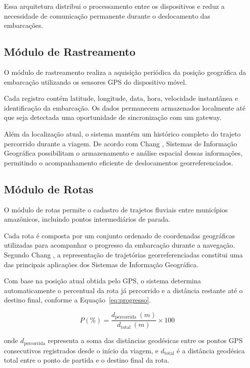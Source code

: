 \documentclass[12pt]{article}
\begin{document}
Essa arquitetura distribui o processamento entre os dispositivos e reduz a necessidade de comunicação permanente durante o deslocamento das embarcações.

\subsection{Módulo de Rastreamento}
O módulo de rastreamento realiza a aquisição periódica da posição geográfica da embarcação utilizando os sensores GPS do dispositivo móvel.

Cada registro contém latitude, longitude, data, hora, velocidade instantânea e identificação da embarcação. Os dados permanecem armazenados localmente até que seja detectada uma oportunidade de sincronização com um gateway.

Além da localização atual, o sistema mantém um histórico completo do trajeto percorrido durante a viagem. De acordo com Chang \cite{chang2018gis}, Sistemas de Informação Geográfica possibilitam o armazenamento e análise espacial dessas informações, permitindo o acompanhamento eficiente de deslocamentos georreferenciados.

\subsection{Módulo de Rotas}
O módulo de rotas permite o cadastro de trajetos fluviais entre municípios amazônicos, incluindo pontos intermediários de parada.

Cada rota é composta por um conjunto ordenado de coordenadas geográficas utilizadas para acompanhar o progresso da embarcação durante a navegação. Segundo Chang \cite{chang2018gis}, a representação de trajetórias georreferenciadas constitui uma das principais aplicações dos Sistemas de Informação Geográfica.

Com base na posição atual obtida pelo GPS, o sistema determina automaticamente o percentual da rota já percorrido e a distância restante até o destino final, conforme a Equação~\ref{eq:progresso}.

\begin{equation}
\label{eq:progresso}
P(\%) = \frac{d_{\text{percorrida}}\ (m)}{d_{\text{total}}\ (m)} \times 100
\end{equation}

onde $d_{\text{percorrida}}$ representa a soma das distâncias geodésicas entre os pontos GPS consecutivos registrados desde o início da viagem, e $d_{\text{total}}$ é a distância geodésica total entre o ponto de partida e o destino final da rota.
\end{document}
